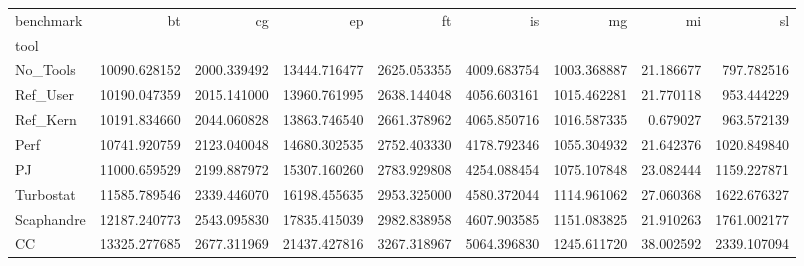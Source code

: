 \begin{tabular}{lrrrrrrrr}
\toprule
benchmark & bt & cg & ep & ft & is & mg & mi & sl \\
tool &  &  &  &  &  &  &  &  \\
\midrule
No_Tools & 10090.628152 & 2000.339492 & 13444.716477 & 2625.053355 & 4009.683754 & 1003.368887 & 21.186677 & 797.782516 \\
Ref_User & 10190.047359 & 2015.141000 & 13960.761995 & 2638.144048 & 4056.603161 & 1015.462281 & 21.770118 & 953.444229 \\
Ref_Kern & 10191.834660 & 2044.060828 & 13863.746540 & 2661.378962 & 4065.850716 & 1016.587335 & 0.679027 & 963.572139 \\
Perf & 10741.920759 & 2123.040048 & 14680.302535 & 2752.403330 & 4178.792346 & 1055.304932 & 21.642376 & 1020.849840 \\
PJ & 11000.659529 & 2199.887972 & 15307.160260 & 2783.929808 & 4254.088454 & 1075.107848 & 23.082444 & 1159.227871 \\
Turbostat & 11585.789546 & 2339.446070 & 16198.455635 & 2953.325000 & 4580.372044 & 1114.961062 & 27.060368 & 1622.676327 \\
Scaphandre & 12187.240773 & 2543.095830 & 17835.415039 & 2982.838958 & 4607.903585 & 1151.083825 & 21.910263 & 1761.002177 \\
CC & 13325.277685 & 2677.311969 & 21437.427816 & 3267.318967 & 5064.396830 & 1245.611720 & 38.002592 & 2339.107094 \\
\bottomrule
\end{tabular}
